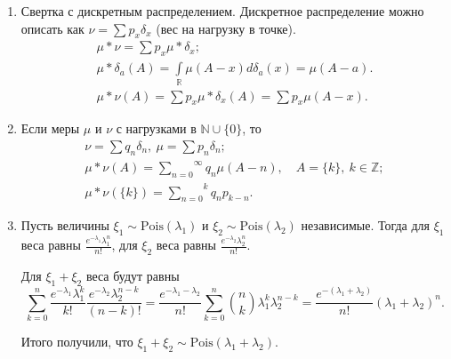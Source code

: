  \begin{examples}
\enewline
     \begin{enumerate}
         \item Свертка с дискретным распределением. Дискретное распределение можно описать как  $\nu = \sum p_x \delta_x$ (вес на нагрузку в точке).
        \begin{gather*}
            \mu*\nu = \sum p_x\mu*\delta_x;\\
            \mu*\delta_a(A) = \int\limits_\mathbb{R}\mu(A- x)d\delta_a(x) = \mu(A-a).\\
            \mu*\nu(A) = \sum p_x\mu*\delta_x(A) = \sum p_x\mu(A-x).
        \end{gather*}

         \item Если меры $\mu$ и $\nu$ с нагрузками в $\mathbb{N}\cup \{0\}$, то
\begin{gather*}
    \nu = \sum q_n\delta_n, \ \mu = \sum p_n\delta_n;\\
    \mu*\nu(A) = \overset{\infty}{\underset{n = 0}{\sum}} q_n\mu(A-n), \quad A = \{k\}, \ k\in\mathbb{Z}; \\
    \mu*\nu(\{k\}) = \overset{k}{\underset{n = 0}{\sum}}q_np_{k - n}.
\end{gather*}
     

         \item Пусть величины $\xi_1 \sim \text{Pois}(\lambda_1)$ и $\xi_2 \sim \text{Pois}(\lambda_2)$ независимые. Тогда
               для $\xi_1$ веса равны $\frac{e^{-\lambda_1}\lambda_1^n}{n!}$, для $\xi_2$ веса равны $\frac{e^{-\lambda_2}\lambda_2^n}{n!}$.

               Для $\xi_1+ \xi_2$ веса будут равны $$\overset{n}{\underset{k = 0}{\sum}}\frac{e^{-\lambda_1}\lambda_1^k}{k!}\frac{e^{-\lambda_2}\lambda_2^{n - k}}{(n - k)!} = \frac{e^{-\lambda_1 - \lambda_2}}{n!}\overset{n}{\underset{k = 0}{\sum}}\binom{n}{k} \lambda_1^k\lambda_2^{n - k} = \frac{e^{-(\lambda_1+\lambda_2)}}{n!}(\lambda_1+\lambda_2)^n.$$

               Итого получили, что $\xi_1+\xi_2\sim \text{Pois}(\lambda_1+\lambda_2)$.
     \end{enumerate}
 \end{examples}
